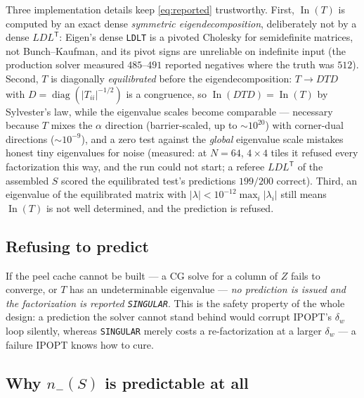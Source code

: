 \documentclass[11pt]{article}
\newcommand{\In}{\operatorname{In}}
\newcommand{\diag}{\operatorname{diag}}
\newcommand{\code}[1]{\texttt{#1}}
\begin{document}
Three implementation details keep \eqref{eq:reported} trustworthy.  First,
$\In(T)$ is computed by an exact dense \emph{symmetric eigendecomposition},
deliberately not by a dense $LDL^{\mathsf T}$: Eigen's dense \code{LDLT} is a
pivoted Cholesky for semidefinite matrices, not Bunch--Kaufman, and its pivot
signs are unreliable on indefinite input (the production solver measured
$485$--$491$ reported negatives where the truth was $512$).  Second, $T$ is
diagonally \emph{equilibrated} before the eigendecomposition:
$T \to DTD$ with $D = \diag(|T_{ii}|^{-1/2})$ is a congruence, so
$\In(DTD) = \In(T)$ by Sylvester's law, while the eigenvalue scales become
comparable --- necessary because $T$ mixes the $\alpha$ direction
(barrier-scaled, up to $\sim\!10^{20}$) with corner-dual directions
($\sim\!10^{-9}$), and a zero test against the \emph{global} eigenvalue scale
mistakes honest tiny eigenvalues for noise (measured: at $N=64$, $4\times4$
tiles it refused every factorization this way, and the run could not start;
a referee $LDL^{\mathsf T}$ of the assembled $S$ scored the equilibrated
test's predictions $199/200$ correct).  Third, an eigenvalue of the
equilibrated matrix with $|\lambda| < 10^{-12}\max_i|\lambda_i|$ still means
$\In(T)$ is not well determined, and the prediction is refused.

\subsection{Refusing to predict}

If the peel cache cannot be built --- a CG solve for a column of $Z$ fails
to converge, or $T$ has an undeterminable eigenvalue --- \emph{no prediction
is issued and the factorization is reported \code{SINGULAR}}.  This is the
safety property of the whole design: a prediction the solver cannot stand
behind would corrupt IPOPT's $\delta_w$ loop silently, whereas
\code{SINGULAR} merely costs a re-factorization at a larger $\delta_w$ ---
a failure IPOPT knows how to cure.

\subsection{Why \texorpdfstring{$n_-(S)$}{n-(S)} is predictable at all}
\label{sec:why-predictable}
\end{document}
